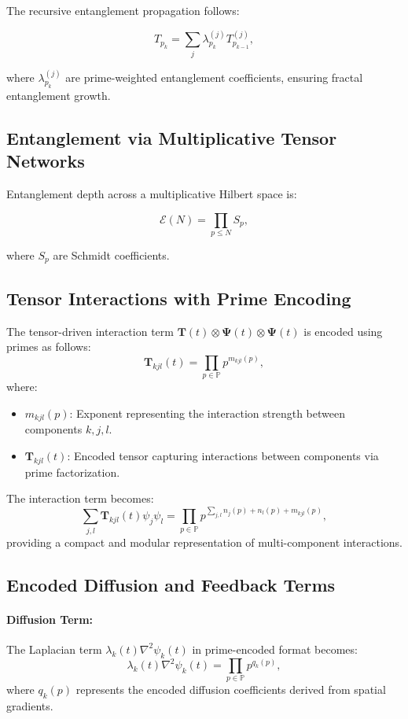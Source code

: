 \documentclass{article}
\theoremstyle{plain}
\begin{document}
The recursive entanglement propagation follows:

\begin{equation}
T_{p_k} = \sum_{j} \lambda_{p_k}^{(j)} T_{p_{k-1}}^{(j)},
\end{equation}

where \( \lambda_{p_k}^{(j)} \) are prime-weighted entanglement coefficients, ensuring fractal entanglement growth.


\subsection{Entanglement via Multiplicative Tensor Networks}
Entanglement depth across a multiplicative Hilbert space is:

\begin{equation}
\mathcal{E}(N) = \prod_{p \leq N} S_p,
\end{equation}

where \( S_p \) are Schmidt coefficients.
\subsection{Tensor Interactions with Prime Encoding}
The tensor-driven interaction term \(\bm{T}(t) \otimes \bm{\Psi}(t) \otimes \bm{\Psi}(t)\) is encoded using primes as follows:
\begin{equation}
\bm{T}_{kjl}(t) = \prod_{p \in \mathbb{P}} p^{m_{kjl}(p)},
\end{equation}
where:
\begin{itemize}
    \item \(m_{kjl}(p)\): Exponent representing the interaction strength between components \(k, j, l\).
    \item \(\bm{T}_{kjl}(t)\): Encoded tensor capturing interactions between components via prime factorization.
\end{itemize}

The interaction term becomes:
\begin{equation}
\sum_{j,l} \bm{T}_{kjl}(t) \psi_j \psi_l = \prod_{p \in \mathbb{P}} p^{\sum_{j,l} n_j(p) + n_l(p) + m_{kjl}(p)},
\end{equation}
providing a compact and modular representation of multi-component interactions.

\subsection{Encoded Diffusion and Feedback Terms}
\paragraph{Diffusion Term:}
The Laplacian term \(\lambda_k(t)\nabla^2 \psi_k(t)\) in prime-encoded format becomes:
\begin{equation}
\lambda_k(t)\nabla^2 \psi_k(t) = \prod_{p \in \mathbb{P}} p^{q_k(p)},
\end{equation}
where \(q_k(p)\) represents the encoded diffusion coefficients derived from spatial gradients.
\end{document}
